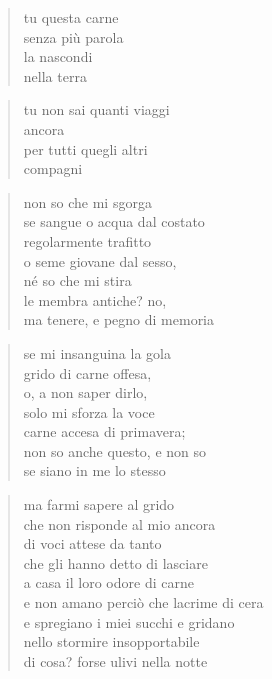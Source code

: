 \begin{verse}
    tu questa carne\\
    senza più parola\\
    la nascondi\\
    nella terra
\end{verse}

\begin{verse}
    tu non sai quanti viaggi\\
    ancora\\
    per tutti quegli altri\\
    compagni
\end{verse}

\clearpage


\begin{verse}
    non so che mi sgorga\\
    se sangue o acqua dal costato\\
    regolarmente trafitto\\
    o seme giovane dal sesso,\\
    né so che mi stira\\
    le membra antiche? no,\\
    ma tenere, e pegno di memoria
\end{verse}

\begin{verse}
    se mi insanguina la gola\\
    grido di carne offesa,\\
    o, a non saper dirlo,\\
    solo mi sforza la voce\\
    carne accesa di primavera;\\
    non so anche questo, e non so\\
    se siano in me lo stesso
\end{verse}

\clearpage


\begin{verse}
    ma farmi sapere al grido\\
    che non risponde al mio ancora\\
    di voci attese da tanto\\
    che gli hanno detto di lasciare\\
    a casa il loro odore di carne\\
    e non amano perciò che lacrime di cera\\
    e spregiano i miei succhi e gridano\\
    nello stormire insopportabile\\
    di cosa? forse ulivi nella notte
\end{verse}

